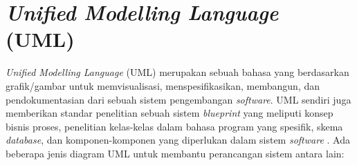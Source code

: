 \section{\textit{Unified Modelling Language} (UML)}

\textit{Unified Modelling Language} (UML) merupakan sebuah bahasa yang berdasarkan grafik/gambar untuk memvisualisasi, menspesifikasikan, membangun, dan pendokumentasian dari sebuah sistem pengembangan \textit{software}. UML sendiri juga memberikan standar penelitian sebuah sistem \textit{blueprint} yang meliputi konsep bisnis proses, penelitian kelas-kelas dalam bahasa program yang spesifik, skema \textit{database}, dan komponen-komponen yang diperlukan dalam sistem \textit{software} \cite{Mubarak2019}. Ada beberapa jenis diagram UML untuk membantu perancangan sistem antara lain:

